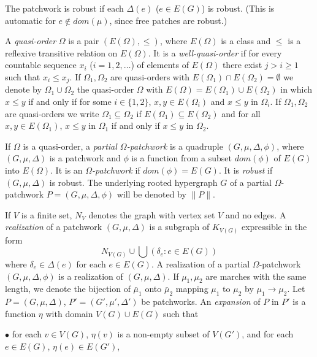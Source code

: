 The patchwork is robust if each $\Delta(e)$ ($e \in E(G)$) is robust. (This is automatic for $e \notin dom(\mu)$, since free patches are robust.)

A \textit{quasi-order} $\Omega$ is a pair $(E(\Omega), \le)$, where $E(\Omega)$ is a class and $\le$ is a reflexive transitive relation on $E(\Omega)$. It is a \textit{well-quasi-order} if for every countable sequence $x_i$ ($i = 1, 2, \dots$) of elements of $E(\Omega)$ there exist $j > i \ge 1$ such that $x_i \le x_j$. If $\Omega_1, \Omega_2$ are quasi-orders with $E(\Omega_1) \cap E(\Omega_2) = \emptyset$ we denote by $\Omega_1 \cup \Omega_2$ the quasi-order $\Omega$ with $E(\Omega) = E(\Omega_1) \cup E(\Omega_2)$ in which $x \le y$ if and only if for some $i \in \{1, 2\}$, $x, y \in E(\Omega_i)$ and $x \le y$ in $\Omega_i$. If $\Omega_1, \Omega_2$ are quasi-orders we write $\Omega_1 \subseteq \Omega_2$ if $E(\Omega_1) \subseteq E(\Omega_2)$ and for all $x, y \in E(\Omega_1)$, $x \le y$ in $\Omega_1$ if and only if $x \le y$ in $\Omega_2$.

If $\Omega$ is a quasi-order, a \textit{partial $\Omega$-patchwork} is a quadruple $(G, \mu, \Delta, \phi)$, where $(G, \mu, \Delta)$ is a patchwork and $\phi$ is a function from a subset $dom(\phi)$ of $E(G)$ into $E(\Omega)$. It is an \textit{$\Omega$-patchwork} if $dom(\phi) = E(G)$. It is \textit{robust} if $(G, \mu, \Delta)$ is robust. The underlying rooted hypergraph $G$ of a partial $\Omega$-patchwork $P = (G, \mu, \Delta, \phi)$ will be denoted by $\|P\|$.

If $V$ is a finite set, $N_V$ denotes the graph with vertex set $V$ and no edges. A \textit{realization} of a patchwork $(G, \mu, \Delta)$ is a subgraph of $K_{V(G)}$ expressible in the form
\begin{equation*}
N_{V(G)} \cup \bigcup (\delta_e \colon e \in E(G))
\end{equation*}
where $\delta_e \in \Delta(e)$ for each $e \in E(G)$. A realization of a partial $\Omega$-patchwork $(G, \mu, \Delta, \phi)$ is a realization of $(G, \mu, \Delta)$. If $\mu_1, \mu_2$ are marches with the same length, we denote the bijection of $\bar{\mu}_1$ onto $\bar{\mu}_2$ mapping $\mu_1$ to $\mu_2$ by $\mu_1 \to \mu_2$. Let $P = (G, \mu, \Delta)$, $P' = (G', \mu', \Delta')$ be patchworks. An \textit{expansion} of $P$ in $P'$ is a function $\eta$ with domain $V(G) \cup E(G)$ such that

\hspace*{12pt}$\bullet$ for each $v \in V(G)$, $\eta(v)$ is a non-empty subset of $V(G')$, and for each $e \in E(G)$, $\eta(e) \in E(G')$,

